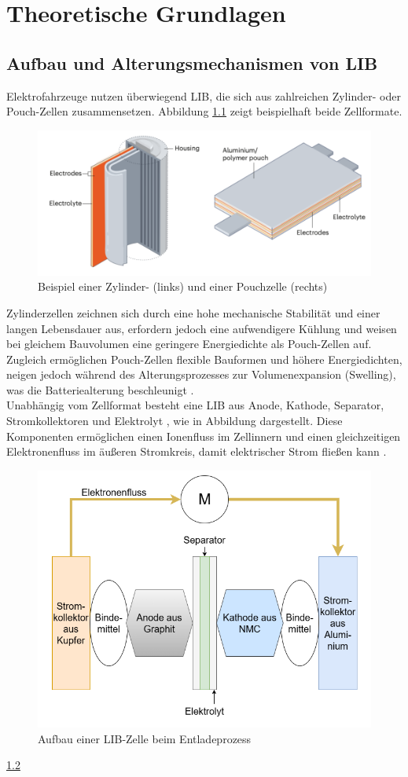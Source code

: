 
\chapter{Theoretische Grundlagen}

\section{Aufbau und Alterungsmechanismen von \acs{LIB}}
Elektrofahrzeuge nutzen überwiegend \acs{LIB}, die sich aus zahlreichen Zylinder- oder Pouch-Zellen zusammensetzen. Abbildung \ref{fig:pouch-zylinder-zelle} zeigt beispielhaft beide Zellformate. 
\begin{figure}[H]
	\centering
	\includegraphics[height=0.25\linewidth]{resources/images/pouch-zylinder-zelle}
	\caption{Beispiel einer Zylinder- (links) und einer Pouchzelle (rechts)}
	\label{fig:pouch-zylinder-zelle}
\end{figure}

Zylinderzellen zeichnen sich durch eine hohe mechanische Stabilität und einer langen Lebensdauer aus, erfordern jedoch eine aufwendigere Kühlung und weisen bei gleichem Bauvolumen eine geringere Energiedichte als Pouch-Zellen auf. Zugleich ermöglichen Pouch-Zellen flexible Bauformen und höhere Energiedichten, neigen jedoch während des Alterungsprozesses zur Volumenexpansion (Swelling), was die Batteriealterung beschleunigt \cite{articlePouchZellenAlterung}.
\\
Unabhängig vom Zellformat besteht eine \acs{LIB} aus Anode, Kathode, Separator, Stromkollektoren und Elektrolyt \cite{urlIdRecentAdvancementsLIB}, wie in Abbildung  dargestellt. Diese Komponenten ermöglichen einen Ionenfluss im Zellinnern und einen gleichzeitigen Elektronenfluss im äußeren Stromkreis, damit elektrischer Strom fließen kann \cite{urlIdLIBFUnktionsweise}.
\begin{figure}[H]
	\centering
	\includegraphics[height=0.4\linewidth]{resources/images/aufbau-nmc-zelle}
	\caption{Aufbau einer \acs{LIB}-Zelle beim Entladeprozess \cite{articleAlterungLithiumBatterien}}
	\label{fig:aufbau-nmc-zelle}
\end{figure}
\ref{fig:aufbau-nmc-zelle}

